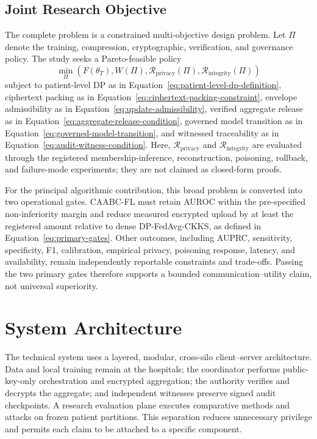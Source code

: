 \subsection{Joint Research Objective}
\label{subsec:joint-research-objective}

The complete problem is a constrained multi-objective design problem. Let $\Pi$ denote the training, compression, cryptographic, verification, and governance policy. The study seeks a Pareto-feasible policy
\begin{equation}
    \min_{\Pi}\left(
        F(\theta_T),
        W(\Pi),
        \mathcal{R}_{\mathrm{privacy}}(\Pi),
        \mathcal{R}_{\mathrm{integrity}}(\Pi)
    \right)
    \label{eq:joint-multiobjective}
\end{equation}
subject to patient-level DP as in Equation~\ref{eq:patient-level-dp-definition}, ciphertext packing as in Equation~\ref{eq:ciphertext-packing-constraint}, envelope admissibility as in Equation~\ref{eq:update-admissibility}, verified aggregate release as in Equation~\ref{eq:aggregate-release-condition}, governed model transition as in Equation~\ref{eq:governed-model-transition}, and witnessed traceability as in Equation~\ref{eq:audit-witness-condition}. Here, $\mathcal{R}_{\mathrm{privacy}}$ and $\mathcal{R}_{\mathrm{integrity}}$ are evaluated through the registered membership-inference, reconstruction, poisoning, rollback, and failure-mode experiments; they are not claimed as closed-form proofs.

For the principal algorithmic contribution, this broad problem is converted into two operational gates. CAABC-FL must retain AUROC within the pre-specified non-inferiority margin and reduce measured encrypted upload by at least the registered amount relative to dense DP-FedAvg-CKKS, as defined in Equation~\ref{eq:primary-gates}. Other outcomes, including AUPRC, sensitivity, specificity, F1, calibration, empirical privacy, poisoning response, latency, and availability, remain independently reportable constraints and trade-offs. Passing the two primary gates therefore supports a bounded communication--utility claim, not universal superiority.

\section{System Architecture}
\label{sec:system-architecture}

The technical system uses a layered, modular, cross-silo client--server architecture. Data and local training remain at the hospitals; the coordinator performs public-key-only orchestration and encrypted aggregation; the authority verifies and decrypts the aggregate; and independent witnesses preserve signed audit checkpoints. A research evaluation plane executes comparative methods and attacks on frozen patient partitions. This separation reduces unnecessary privilege and permits each claim to be attached to a specific component.

